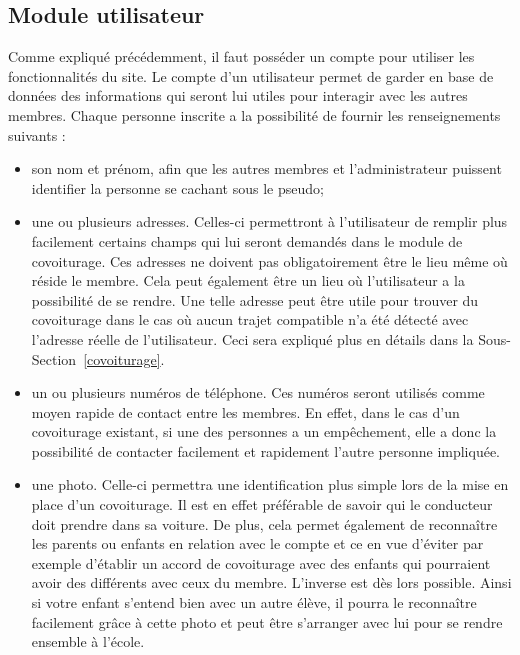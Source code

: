 \documentclass[12pt, a4paper, oneside]{article}
\begin{document}
\subsection{Module utilisateur} \label{utilisateur}
    Comme expliqué précédemment, il faut posséder un compte pour utiliser les fonctionnalités du site. Le compte d'un utilisateur permet de garder en base de données des informations qui seront lui utiles pour interagir avec les autres membres. Chaque personne inscrite a la possibilité de fournir les renseignements suivants :\\
    \begin{itemize}
        \item son nom et prénom, afin que les autres membres et l'administrateur puissent identifier la personne se cachant sous le pseudo;\\
        \item une ou plusieurs adresses. Celles-ci permettront à l'utilisateur de remplir plus facilement certains champs qui lui seront demandés dans le module de covoiturage. Ces adresses ne doivent pas obligatoirement être le lieu même où réside le membre. Cela peut également être un lieu où l'utilisateur a la possibilité de se rendre. Une telle adresse peut être utile pour trouver du covoiturage dans le cas où aucun trajet compatible n'a été détecté avec l'adresse réelle de l'utilisateur. Ceci sera expliqué plus en détails dans la Sous-Section~\ref{covoiturage}.\\
        \item un ou plusieurs numéros de téléphone. Ces numéros seront utilisés comme moyen rapide de contact entre les membres. En effet, dans le cas d'un covoiturage existant, si une des personnes a un empêchement, elle a donc la possibilité de contacter facilement et rapidement l'autre personne impliquée.\\
        \item une photo. Celle-ci permettra une identification plus simple lors de la mise en place d'un covoiturage. Il est en effet préférable de savoir qui le conducteur doit prendre dans sa voiture. De plus, cela permet également de reconnaître les parents ou enfants en relation avec le compte et ce en vue d'éviter par exemple d'établir un accord de covoiturage avec des enfants qui pourraient avoir des différents avec ceux du membre. L'inverse est dès lors possible. Ainsi si votre enfant s'entend bien avec un autre élève, il pourra le reconnaître facilement grâce à cette photo et peut être s'arranger avec lui pour se rendre ensemble à l'école.\\
    \end{itemize}
\end{document}
